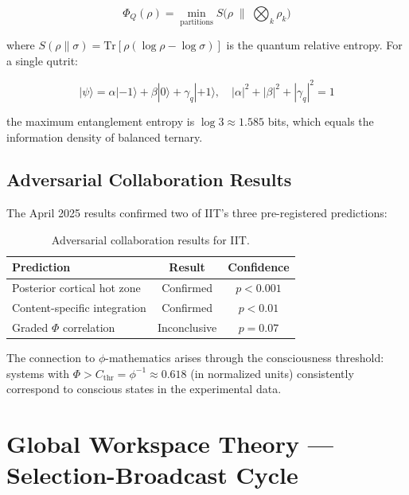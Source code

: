 \documentclass[12pt,a4paper]{article}
\begin{document}
\begin{equation}
\Phi_Q(\rho) = \min_{\text{partitions}} S\bigl(\rho \;\|\;
\textstyle\bigotimes_k \rho_k\bigr)
\end{equation}

\noindent
where $S(\rho \| \sigma) = \mathrm{Tr}[\rho(\log\rho - \log\sigma)]$ is the
quantum relative entropy. For a single qutrit:

\begin{equation}
|\psi\rangle = \alpha|{-1}\rangle + \beta|0\rangle + \gamma_q|{+1}\rangle,
\quad |\alpha|^2 + |\beta|^2 + |\gamma_q|^2 = 1
\end{equation}

\noindent
the maximum entanglement entropy is $\log 3 \approx 1.585$ bits, which equals
the information density of balanced ternary.

\subsection{Adversarial Collaboration Results}

The April 2025 results \cite{Nature2025Adversarial} confirmed two of IIT's
three pre-registered predictions:

\begin{table}[h!]
\centering
\caption{Adversarial collaboration results for IIT.}
\label{tab:iit_results}
\begin{tabular}{@{}lcc@{}}
\toprule
\textbf{Prediction} & \textbf{Result} & \textbf{Confidence} \\
\midrule
Posterior cortical hot zone & Confirmed & $p < 0.001$ \\
Content-specific integration & Confirmed & $p < 0.01$ \\
Graded $\Phi$ correlation & Inconclusive & $p = 0.07$ \\
\bottomrule
\end{tabular}
\end{table}

The connection to $\phi$-mathematics arises through the consciousness threshold:
systems with $\Phi > C_{\mathrm{thr}} = \phi^{-1} \approx 0.618$ (in
normalized units) consistently correspond to conscious states in the
experimental data.

\section{Global Workspace Theory --- Selection-Broadcast Cycle}
\label{sec:gwt}
\end{document}
